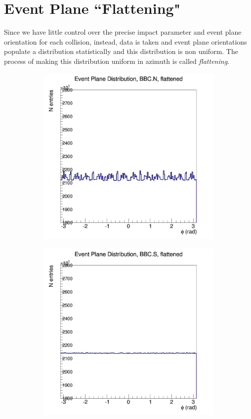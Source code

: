 \section{Event Plane ``Flattening"}
Since we have little control over the precise impact parameter and event plane orientation for each collision, instead, data is taken and event plane orientations populate a distribution statistically and this distribution is non uniform. The process of making this distribution uniform in azimuth is called \textit{flattening}.

\begin{figure}[htbp!]
  \centering
    \begin{subfigure}[p]{0.4\textwidth}
    \includegraphics[width=1\textwidth]{EPflattening/flatbbcn.jpg}
    \end{subfigure}
    \begin{subfigure}[p]{0.4\textwidth}
    \includegraphics[width=1\textwidth]{EPflattening/flatbbcs.jpg}

\end{subfigure}
\end{figure}
